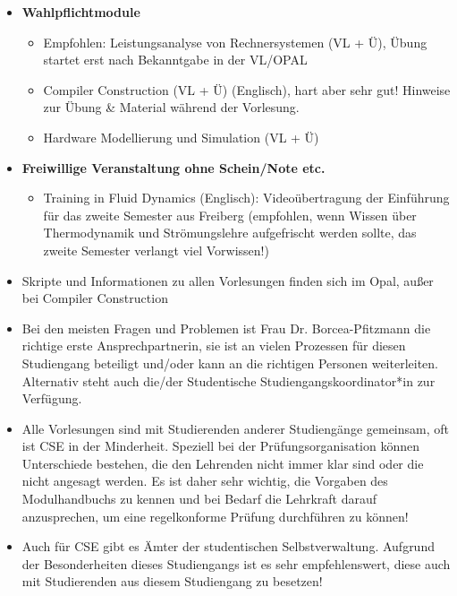 \documentclass[a4paper,12pt]{report}
\begin{document}
\begin{itemize}
    \item \textbf{Wahlpflichtmodule}
    \begin{itemize}
        \item Empfohlen: Leistungsanalyse von Rechnersystemen (VL + Ü), Übung startet erst nach Bekanntgabe in der VL/OPAL
        \item Compiler Construction (VL + Ü) (Englisch), hart aber sehr gut! Hinweise zur Übung \& Material während der Vorlesung.
        \item Hardware Modellierung und Simulation (VL + Ü)
    \end{itemize}
    \item \textbf{Freiwillige Veranstaltung ohne Schein/Note etc.}
    \begin{itemize}
        \item Training in Fluid Dynamics (Englisch): Videoübertragung der Einführung für das zweite Semester aus Freiberg (empfohlen, wenn Wissen über Thermodynamik und Strömungslehre aufgefrischt werden sollte, das zweite Semester verlangt viel Vorwissen!)
    \end{itemize}
    \item Skripte und Informationen zu allen Vorlesungen finden sich im Opal, außer bei Compiler Construction
    \item Bei den meisten Fragen und Problemen ist Frau Dr. Borcea-Pfitzmann die richtige erste Ansprechpartnerin, sie ist an vielen Prozessen für diesen Studiengang beteiligt und/oder kann an die richtigen Personen weiterleiten. Alternativ steht auch die/der Studentische Studiengangskoordinator*in zur Verfügung.
    \item Alle Vorlesungen sind mit Studierenden anderer Studiengänge gemeinsam, oft ist CSE in der Minderheit. Speziell bei der Prüfungsorganisation können Unterschiede bestehen, die den Lehrenden nicht immer klar sind oder die nicht angesagt werden. Es ist daher sehr wichtig, die Vorgaben des Modulhandbuchs zu kennen und bei Bedarf die Lehrkraft darauf anzusprechen, um eine regelkonforme Prüfung durchführen zu können!
    \item Auch für CSE gibt es Ämter der studentischen Selbstverwaltung. Aufgrund der Besonderheiten dieses Studiengangs ist es sehr empfehlenswert, diese auch mit Studierenden aus diesem Studiengang zu besetzen!
\end{itemize}
\end{document}
